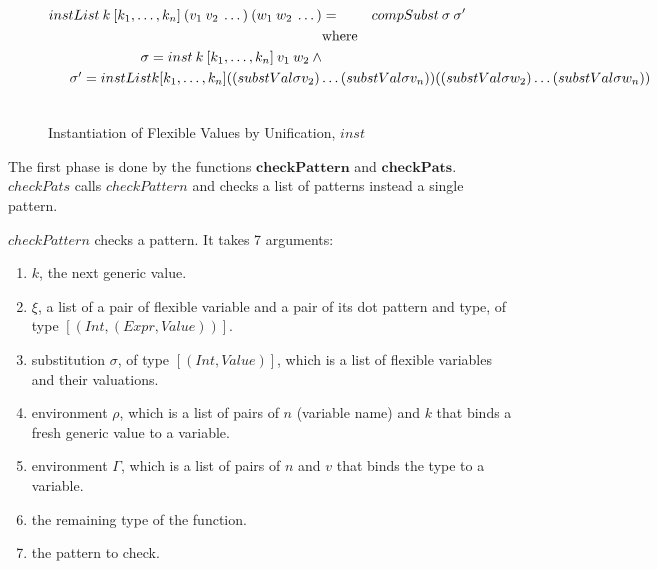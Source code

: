 \begin{figure}[H]
\begin{equation*}
\begin{aligned}
      instList \: k \: [k_1,\dots,k_n] \: (v_1 \: v_2 \: \dots) \: (w_1 \: w_2 \: \dots) & =              & compSubst \: \sigma \: \sigma'                                                                                                                                    \\
                                                                                         & \textrm{where} &                                                                                                                                                                   \\
      \sigma = inst \: k \: [k_1,\dots,k_n] \: v_1 \: w_2 \: \land                       &                &                                                                                                                                                                   \\
      \noalign{$\sigma'                                                                             =               instList \: k [k_1,\dots,k_n] \: ((substVal \sigma \: v_2) \dots (substVal \sigma \: v_n)) \: ((substVal \sigma \: w_2) \dots (substVal \sigma \: w_n))$} \\
    \end{aligned}
  \end{equation*}
  \caption{Instantiation of Flexible Values by Unification, $inst$}
\end{figure}

The first phase is done by the functions $\boldsymbol{checkPattern}$ and $\boldsymbol{checkPats}$. $checkPats$ calls $checkPattern$ and checks a list of patterns instead a single pattern.

$checkPattern$ checks a pattern. It takes 7 arguments:

\begin{enumerate}
  \item $k$, the next generic value.
  \item $\xi$, a list of a pair of flexible variable and a pair of its dot pattern and type, of type $[(Int, (Expr, Value))]$.
  \item substitution $\sigma$, of type $[(Int, Value)]$, which is a list of flexible variables and their valuations.
  \item environment $\rho$, which is a list of pairs of $n$ (variable name) and $k$ that binds a fresh generic value to a variable.
  \item environment $\Gamma$, which is a list of pairs of $n$ and $v$ that binds the type to a variable.
  \item the remaining type of the function.
  \item the pattern to check.
\end{enumerate}

